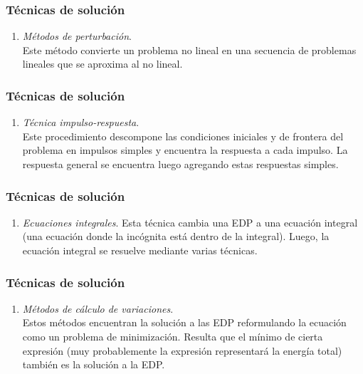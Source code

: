 \documentclass[12pt]{beamer}
\begin{document}
\begin{frame}
\frametitle{Técnicas de solución}
\begin{enumerate}
\conti
\item \emph{Métodos de perturbación}.
\\
\bigskip
Este método convierte un problema no lineal en una secuencia de problemas lineales que se aproxima al no lineal.
\seti
\end{enumerate}
\end{frame}
\begin{frame}
\frametitle{Técnicas de solución}
\begin{enumerate}
\conti
\item \emph{Técnica impulso-respuesta}.
\\
\bigskip
Este procedimiento descompone las condiciones iniciales y de frontera del problema en impulsos simples y encuentra la respuesta a cada impulso. La respuesta general se encuentra luego agregando estas respuestas simples.
\seti
\end{enumerate}
\end{frame}
\begin{frame}
\frametitle{Técnicas de solución}
\begin{enumerate}
\conti
\item \emph{Ecuaciones integrales}. Esta técnica cambia una EDP a una ecuación integral (una ecuación donde la incógnita está dentro de la integral). Luego, la ecuación integral se resuelve mediante varias técnicas.
\seti
\end{enumerate}
\end{frame}
\begin{frame}
\frametitle{Técnicas de solución}
\begin{enumerate}
\conti
\item \emph{Métodos de cálculo de variaciones}.
\\
\bigskip
Estos métodos encuentran la solución a las EDP reformulando la ecuación como un problema de minimización. Resulta que el mínimo de cierta expresión (muy probablemente la expresión representará la energía total) también es la solución a la EDP.
\seti
\end{enumerate}
\end{frame}
\end{document}
